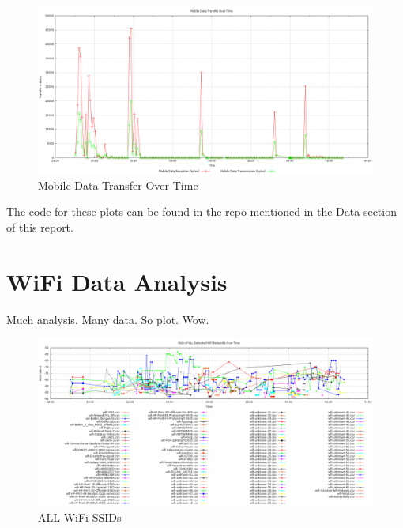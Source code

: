 \documentclass[journal,twocolumn]{IEEEtran}
\begin{document}
\begin{figure}
\begin{center}
\includegraphics[scale=0.3]{cell-data/cell-2.png}
\caption{Mobile Data Transfer Over Time}
\label{fig_cell_2}
\end{center}
\end{figure}

The code for these plots can be found in the repo mentioned in the Data 
section of this report.

\section{WiFi Data Analysis}

Much analysis. Many data. So plot. Wow.

\begin{figure}
\begin{center}
\includegraphics[scale=0.3]{wifi-data/001-everything.png}
\caption{ALL WiFi SSIDs}
\label{fig_wifi_1}
\end{center}
\end{figure}
\end{document}
